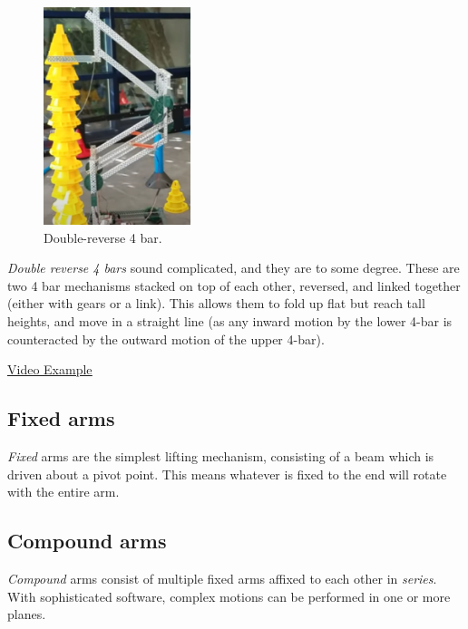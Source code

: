 \begin{figure}[H]
	\includegraphics[height=2.5in]{imgs/double_reverse_4bar.png}
	\caption{Double-reverse 4 bar.}
\end{figure}

\textit{Double reverse 4 bars} sound complicated, and they are to some degree. These are two 4 bar mechanisms stacked on top of each other, reversed, and linked together (either with gears or a link). This allows them to fold up flat but reach tall heights, and move in a straight line (as any inward motion by the lower 4-bar is counteracted by the outward motion of the upper 4-bar).

\href{https://www.youtube.com/watch?v=iFq8dKUZOww}{\color{red}\underline{Video Example}}


\subsection{Fixed arms}
\textit{Fixed} arms are the simplest lifting mechanism, consisting of a beam which is driven about a pivot point. This means whatever is fixed to the end will rotate with the entire arm.

\subsection{Compound arms}
\textit{Compound} arms consist of multiple fixed arms affixed to each other in \textit{series}. With sophisticated software, complex motions can be performed in one or more planes.

